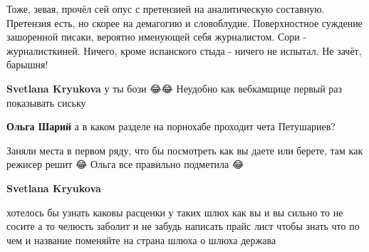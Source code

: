 \begin{itemize}
\begin{itemize}
 

Тоже, зевая, прочёл сей опус с претензией на аналитическую составную. Претензия
есть, но скорее на демагогию и словоблудие. Поверхностное суждение зашоренной
писаки, вероятно именующей себя журналистом. Сори - журналисткиней. Ничего,
кроме испанского стыда - ничего не испытал. Не зачёт, барышня!

 
\textbf{Svetlana Kryukova} у ты бози 😂😂 Неудобно как вебкамщице первый раз показывать сиську

 
\textbf{Ольга Шарий} а в каком разделе на порнохабе проходит чета Петушариев?

 
Заняли места в первом ряду, что бы посмотреть как вы даете или берете, там как режисер решит 😂 Ольга все правильно подметила 😂

 
\textbf{Svetlana Kryukova} 

хотелось бы узнать каковы расценки у таких шлюх как вы и вы сильно то не сосите
а то челюсть заболит и не забудь написать прайс лист чтобы знать что по чем и
название поменяйте на страна шлюха о шлюха держава

 

\end{itemize}
\end{itemize}
